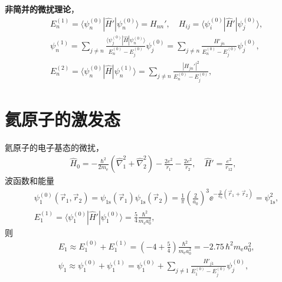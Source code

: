 \textbf{非简并的微扰理论}，
\begin{align}
    &E_n^{(1)} = \langle \psi_n^{(0)} | \hat H' | \psi_n^{(0)} \rangle = H_{nn}', \quad H_{ij} = \langle \psi_i^{(0)} | \hat H' | \psi_j^{(0)} \rangle, \\
    &\psi_n^{(1)} = \sum_{j\neq n} \frac{\langle \psi_j^{(0)} | \hat H | \psi_n^{(0)} \rangle} {E_n^{(0)} - E_j^{(0)}} \psi_j^{(0)} = \sum_{j\neq n} \frac{H'_{jn}}{E_n^{(0)} - E_j^{(0)}} \psi_j^{(0)},\\
    &E_n^{(2)} = \langle \psi_n^{(0)} | \hat H | \psi_n^{(1)} \rangle = 
    \sum_{j\neq n} \frac{|H_{jn}'|^2}{E_n^{(0)} - E_j^{(0)}}, 
\end{align}

\section{氦原子的激发态}
氦原子的电子基态的微扰，
\begin{align}
    \hat H_0 = - \frac{\hbar^2}{2m_{\mathrm e}} (\hat \nabla_1^2 + \hat \nabla_2^2) - \frac{2e^2}{r_1} - \frac{2e^2}{r_2}, \quad \hat H' = \frac{e^2}{r_{12}},
\end{align}
波函数和能量
\begin{align}
    &\psi_1^{(0)}(\vec r_1, \vec r_2) = \psi_{\text{1s}} (\vec r_1) \psi_{\text{1s}} (\vec r_2) = \frac 1\pi \left(\frac2{a_0}\right)^3 \ee^{-\frac2{a_0}(\vec r_1 + \vec r_2)} = \psi_{\text{1s}}^2,
    \\
    &E_1^{(1)} =  \langle \psi_1^{(0)} | \hat H' | \psi_1^{(0)} \rangle = \frac 54 \frac{\hbar^2}{m_\mathrm{e} a_0^2}, 
\end{align}
则
\begin{align}
    &E_1 \approx  E_1^{(0)} + E_1^{(1)} = \left(-4 + \frac54\right) \frac{\hbar^2}{m_\mathrm{e}a_0^2} = -2.75 \,{\hbar^2}{m_\mathrm{e}a_0^2},\\
    &\psi_1 \approx  \psi_1^{(0)} + \psi_1^{(1)} = \psi_1^{(0)} + \sum_{j\neq1} \frac{H'_{j1}}{E_1^{(0)} - E_j^{(0)}} \psi_j^{(0)},
\end{align}

